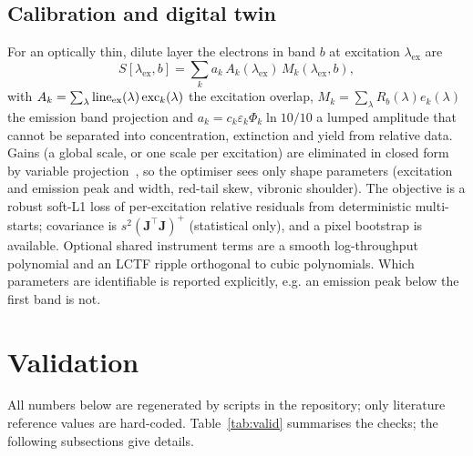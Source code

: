 \documentclass[journal]{IEEEtran}
\newcommand{\lex}{\lambda_{\mathrm{ex}}}
\begin{document}
\subsection{Calibration and digital twin}
For an optically thin, dilute layer the electrons in band $b$ at excitation $\lex$ are
\begin{equation}
S[\lex,b]=\sum_ka_k\,A_k(\lex)\,M_k(\lex,b),
\label{eq:calib}
\end{equation}
with $A_k=\sum_\lambda \mathrm{line}_{\rm ex}(\lambda)\,\mathrm{exc}_k(\lambda)$ the excitation overlap, $M_k=\sum_\lambda R_b(\lambda)e_k(\lambda)$ the emission band projection and $a_k=c_k\varepsilon_k\Phi_k\ln10/10$ a lumped amplitude that cannot be separated into concentration, extinction and yield from relative data. Gains (a global scale, or one scale per excitation) are eliminated in closed form by variable projection~\cite{golub1973}, so the optimiser sees only shape parameters (excitation and emission peak and width, red-tail skew, vibronic shoulder). The objective is a robust soft-L1 loss of per-excitation relative residuals from deterministic multi-starts; covariance is $s^2(\mathbf J^\top\mathbf J)^+$ (statistical only), and a pixel bootstrap is available. Optional shared instrument terms are a smooth log-throughput polynomial and an LCTF ripple orthogonal to cubic polynomials. Which parameters are identifiable is reported explicitly, e.g. an emission peak below the first band is not.

\section{Validation}
\label{sec:validation}
All numbers below are regenerated by scripts in the repository; only literature reference values are hard-coded. Table~\ref{tab:valid} summarises the checks; the following subsections give details.
\end{document}
